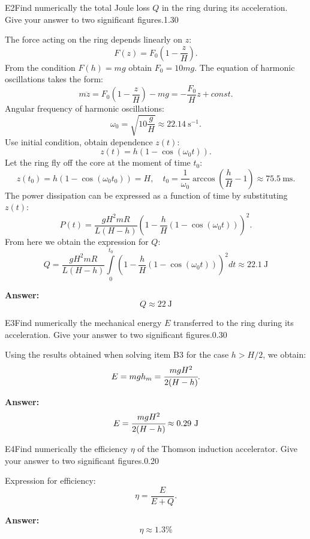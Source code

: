 \documentclass[11pt,a4paper]{article}
\begin{document}
\begin{solcard}{E2}{Find numerically the total Joule loss $Q$ in the ring during its acceleration. Give your answer to two significant figures.}{1.30}

The force acting on the ring depends linearly on $z$: $$ F(z) = F_0 \left(1-\frac{z}{H}\right). $$From the condition $F(h) = mg$ obtain $F_0 = 10 mg$. The equation of harmonic oscillations takes the form: $$ m \ddot{z} =  F_0 \left(1-\frac{z}{H}\right)-mg = -\frac{F_0}{H} z + const. $$Angular frequency of harmonic oscillations: $$ \omega_0 = \sqrt{10\frac{g}{H}} \approx 22.14~\mathrm{s}^{-1}. $$Use initial condition, obtain dependence $z(t)$: $$ z(t) = h(1-\cos(\omega_0 t)). $$Let the ring fly off the core at the moment of time $t_0$: $$z(t_0) = h(1-\cos(\omega_0 t_0)) = H, \quad t_0 = \frac{1}{\omega_0} \arccos \left(\frac{h}{H}-1 \right) \approx 75.5~\text{ms}. $$The power dissipation can be expressed as a function of time by substituting $z(t)$: $$ P(t) = \frac{gH^2mR}{L(H-h)}\left(1-\frac{h}{H}\left(1-\cos(\omega_0 t)\right)\right)^2. $$From here we obtain the expression for $Q$: $$ Q = \frac{gH^2mR}{L(H-h)} \int\limits_0^{t_0} \left(1-\frac{h}{H}\left(1-\cos(\omega_0 t)\right)\right)^2 dt \approx 22.1~\text{J} $$

\par\smallskip\noindent\textbf{Answer:} $$ Q \approx 22~\mathrm{J} $$
\end{solcard}

\begin{solcard}{E3}{Find numerically the mechanical energy $E$ transferred to the ring during its acceleration. Give your answer to two significant figures.}{0.30}

Using the results obtained when solving item B3 for the case $h>H/2$, we obtain: $$E=mgh_m= \cfrac{mgH^2}{2(H-h)}. $$

\par\smallskip\noindent\textbf{Answer:} $$ E=\cfrac{mgH^2}{2(H-h)} \approx 0.29~\mathrm{J} $$
\end{solcard}

\begin{solcard}{E4}{Find numerically the efficiency $\eta$ of the Thomson induction accelerator. Give your answer to two significant figures.}{0.20}

Expression for efficiency: $$ \eta=\frac{E}{E+Q}. $$

\par\smallskip\noindent\textbf{Answer:} $$ \eta \approx 1.3 \text{\%} $$
\end{solcard}
\end{document}
